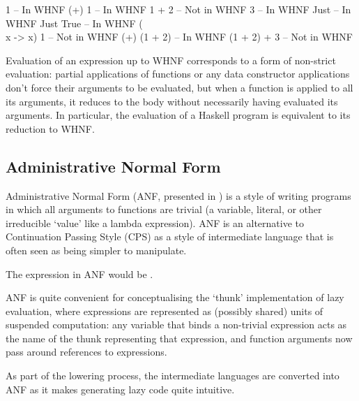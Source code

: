 \documentclass[dissertation.tex]{subfiles}
\begin{document}
{{        \begin{haskellfigure}
        1               -- In WHNF
        (+) 1           -- In WHNF
        1 + 2           -- Not in WHNF
        3               -- In WHNF
        Just            -- In WHNF
        Just True       -- In WHNF
        (\\x -> x) 1    -- Not in WHNF
        (+) (1 + 2)     -- In WHNF
        (1 + 2) + 3     -- Not in WHNF
        \end{haskellfigure}

        Evaluation of an expression up to WHNF corresponds to a form of non-strict evaluation: partial applications of
        functions or any data constructor applications don't force their arguments to be evaluated, but when a function
        is applied to all its arguments, it reduces to the body without necessarily having evaluated its arguments. In
        particular, the evaluation of a Haskell program is equivalent to its reduction to WHNF.

    }
    \subsection{Administrative Normal Form}\label{sec:anf}
    {

        Administrative Normal Form (ANF, presented in \cite{ANF}) is a style of writing programs in which all arguments
        to functions are trivial (a variable, literal, or other irreducible `value' like a lambda expression). ANF is an
        alternative to Continuation Passing Style (CPS) as a style of intermediate language that is often seen as being
        simpler to manipulate.

        The expression  in ANF would be .

        ANF is quite convenient for conceptualising the `thunk' implementation of lazy evaluation, where expressions are
        represented as (possibly shared) units of suspended computation: any variable that binds a non-trivial
        expression acts as the name of the thunk representing that expression, and function arguments now pass around
        references to expressions.

        As part of the lowering process, the intermediate languages are converted into ANF as it makes generating lazy
        code quite intuitive.

    }


}
\end{document}
